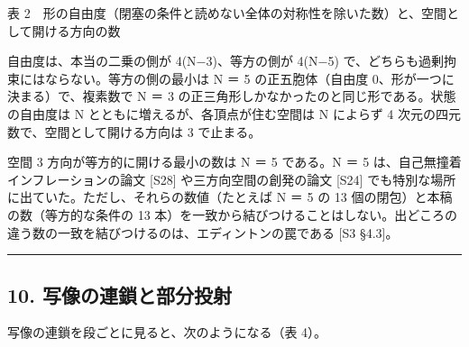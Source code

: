 \documentclass[
  a4paper,
]{ltjsarticle}
\begin{document}
表
2　形の自由度（閉塞の条件と読めない全体の対称性を除いた数）と、空間として開ける方向の数

自由度は、本当の二乗の側が 4(N−3)、等方の側が 4(N−5)
で、どちらも過剰拘束にはならない。等方の側の最小は N ＝ 5
の正五胞体（自由度 0、形が一つに決まる）で、複素数で N ＝ 3
の正三角形しかなかったのと同じ形である。状態の自由度は N
とともに増えるが、各頂点が住む空間は N によらず 4
次元の四元数で、空間として開ける方向は 3 で止まる。

空間 3 方向が等方的に開ける最小の数は N ＝ 5 である。N ＝ 5
は、自己無撞着インフレーションの論文 {[}S28{]} や三方向空間の創発の論文
{[}S24{]} でも特別な場所に出ていた。ただし、それらの数値（たとえば N ＝
5 の 13 個の閉包）と本稿の数（等方的な条件の 13
本）を一致から結びつけることはしない。出どころの違う数の一致を結びつけるのは、エディントンの罠である
{[}S3 §4.3{]}。

\begin{center}\rule{0.5\linewidth}{0.5pt}\end{center}

\subsection{10.
写像の連鎖と部分投射}\label{ux5199ux50cfux306eux9023ux9396ux3068ux90e8ux5206ux6295ux5c04}

写像の連鎖を段ごとに見ると、次のようになる（表 4）。
\end{document}
